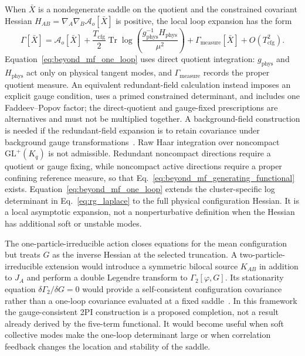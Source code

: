 \documentclass[11pt]{article}
\begin{document}
When $\bar{X}$ is a nondegenerate saddle on the quotient and the constrained covariant Hessian $H_{AB}=\nabla_A\nabla_B\mathcal{A}_o[\bar{X}]$ is positive, the local loop expansion has the form
\begin{equation}
\Gamma[\bar{X}]
=\mathcal{A}_o[\bar{X}]
+\frac{T_{\mathrm{cfg}}}{2}
\operatorname{Tr}\log\left(\frac{g_{\mathrm{phys}}^{-1}H_{\mathrm{phys}}}{\mu^2}\right)
+\Gamma_{\mathrm{measure}}[\bar{X}]
+O(T_{\mathrm{cfg}}^2).
\label{eq:beyond_mf_one_loop}
\end{equation}
Equation~\eqref{eq:beyond_mf_one_loop} uses direct quotient integration: $g_{\mathrm{phys}}$ and $H_{\mathrm{phys}}$ act only on physical tangent modes, and $\Gamma_{\mathrm{measure}}$ records the proper quotient measure. An equivalent redundant-field calculation instead imposes an explicit gauge condition, uses a primed constrained determinant, and includes one Faddeev--Popov factor; the direct-quotient and gauge-fixed prescriptions are alternatives and must not be multiplied together. A background-field construction is needed if the redundant-field expansion is to retain covariance under background gauge transformations~\cite{Abbott1982,FaddeevPopov1967}. Raw Haar integration over noncompact $\mathrm{GL}^+(K_q)$ is not admissible. Redundant noncompact directions require a quotient or gauge fixing, while noncompact active directions require a proper confining reference measure, so that Eq.~\eqref{eq:beyond_mf_generating_functional} exists. Equation~\eqref{eq:beyond_mf_one_loop} extends the cluster-specific log determinant in Eq.~\eqref{eq:rg_laplace} to the full physical configuration Hessian. It is a local asymptotic expansion, not a nonperturbative definition when the Hessian has additional soft or unstable modes.

The one-particle-irreducible action closes equations for the mean configuration but treats $G$ as the inverse Hessian at the selected truncation. A two-particle-irreducible extension would introduce a symmetric bilocal source $K_{AB}$ in addition to $J_A$ and perform a double Legendre transform to $\Gamma_2[\varphi,G]$. Its stationarity equation $\delta\Gamma_2/\delta G=0$ would provide a self-consistent configuration covariance rather than a one-loop covariance evaluated at a fixed saddle~\cite{CornwallJackiwTomboulis1974}. In this framework the gauge-consistent 2PI construction is a proposed completion, not a result already derived by the five-term functional. It would become useful when soft collective modes make the one-loop determinant large or when correlation feedback changes the location and stability of the saddle.
\end{document}
